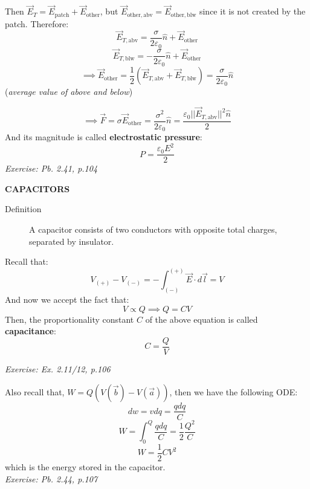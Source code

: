 \documentclass[12pt,a4paper,twoside]{article}
\begin{document}
    \noindent Then \(\overrightarrow{E}_T=\overrightarrow{E}_{\mathrm{patch}}+\overrightarrow{E}_{\mathrm{other}}\), but \(\overrightarrow{E}_{\mathrm{other,abv}}=\overrightarrow{E}_{\mathrm{other,blw}}\) since it is not created by the patch. Therefore:
    \[\overrightarrow{E}_{T,\mathrm{abv}}=\frac{\sigma}{2\varepsilon_0}\hat{n}+\overrightarrow{E}_{\mathrm{other}}\]
    \[\overrightarrow{E}_{T,\mathrm{blw}}=-\frac{\sigma}{2\varepsilon_0}\hat{n}+\overrightarrow{E}_{\mathrm{other}}\]
    \[\implies \overrightarrow{E}_{\mathrm{other}}=\frac{1}{2}(\overrightarrow{E}_{T,\mathrm{abv}}+\overrightarrow{E}_{T,\mathrm{blw}})=\frac{\sigma}{2\varepsilon_0}\hat{n}\]
    (\textit{average value of above and below})
    
    \[\implies \overrightarrow{F}=\sigma\overrightarrow{E}_{\mathrm{other}}=\frac{\sigma^2}{2\varepsilon_0}\hat{n}=\frac{\varepsilon_0||\overrightarrow{E}_{T,\mathrm{abv}}||^2\hat{n}}{2}\]
    And its magnitude is called \textbf{electrostatic pressure}:
    \begin{equation}
        P=\frac{\varepsilon_0E^2}{2}
    \end{equation}
    \textit{Exercise: Pb. 2.41, p.104}\\
    \newline
    
    \noindent \textbf{CAPACITORS}
    \begin{description}
        \item[Definition] A capacitor consists of two conductors with opposite total charges, separated by insulator.
    \end{description}
    Recall that:
    \[V_{(+)}-V_{(-)}=-\int_{(-)}^{(+)}\overrightarrow{E}\cdot d\overrightarrow{l}=V\]
    And now we accept the fact that:
    \[V\propto Q\implies Q=CV\]
    Then, the proportionality constant $C$ of the above equation is called \textbf{capacitance}:
    \begin{equation}
        C=\frac{Q}{V}
        \label{eq:capacitance}
    \end{equation}
    
    \textit{Exercise: Ex. 2.11/12, p.106}\\
    \newline
    
    \noindent Also recall that, $W=Q(V(\overrightarrow{b})-V(\overrightarrow{a}))$, then we have the following ODE:
    \[dw=vdq=\frac{qdq}{C}\]
    \[W=\int_0^Q\frac{qdq}{C}=\frac{1}{2}\frac{Q^2}{C}\]
    \begin{equation}
        W=\frac{1}{2}CV^2
        \label{eq: Capacitor-energy}
    \end{equation}
    which is the energy stored in the capacitor.\\
    \noindent\textit{Exercise: Pb. 2.44, p.107}
\newpage
\end{document}
